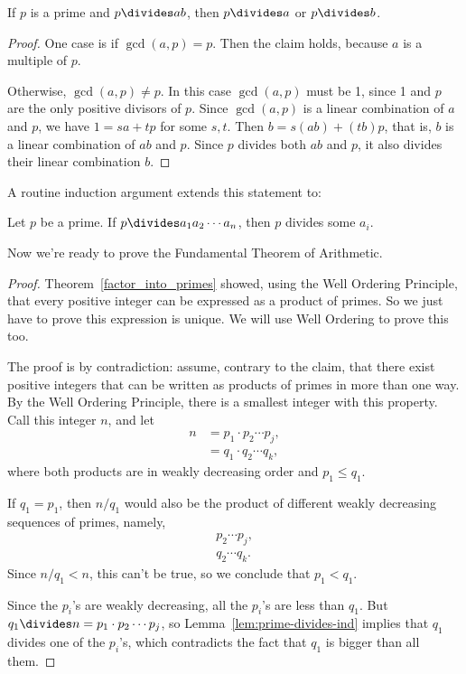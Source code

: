 \begin{lemma}
\label{lem:prime-divides}
If $p$ is a prime and $p \divides ab$, then $p \divides a$ or $p \divides b$.
\end{lemma}

\begin{proof}
One case is if $\gcd(a, p) = p$.  Then the claim holds, because $a$ is a multiple of $p$.

Otherwise, $\gcd(a, p) \neq p$.  In this case $\gcd(a, p)$ must be 1, since 1 and $p$ are
the only positive divisors of $p$.  Since $\gcd(a, p)$ is a linear combination of $a$ and
$p$, we have $1=sa+tp$ for some $s,t$.  Then $b =s(ab)+ (tb)p$, that is, $b$ is a linear
combination of $ab$ and $p$.  Since $p$ divides both $ab$ and $p$, it also divides their
linear combination $b$.
\end{proof}

A routine induction argument extends this statement to:\iffalse the fact we assumed last
time:\fi

\begin{lemma}
\label{lem:prime-divides-ind}
Let $p$ be a prime.  If $p \divides a_1 a_2 \cdots a_n$, then $p$ divides some $a_i$.
\end{lemma}

Now we're ready to prove the Fundamental Theorem of Arithmetic.
\begin{proof}
Theorem~\ref{factor_into_primes} showed, using the Well Ordering Principle, that every
positive integer can be expressed as a product of primes.  So we just have to prove this
expression is unique.  We will use Well Ordering to prove this too.

The proof is by contradiction: assume, contrary to the claim, that there exist positive
integers that can be written as products of primes in more than one way.  By the Well
Ordering Principle, there is a smallest integer with this property.  Call this integer $n$,
and let
\begin{align*}
n & = p_1 \cdot p_2 \cdots p_j, \\
  & = q_1 \cdot q_2 \cdots q_k,
\end{align*}
where both products are in weakly decreasing order and $p_1 \le q_1$.

If $q_1 = p_1$, then $n/q_1$ would also be the product of different weakly decreasing
sequences of primes, namely,
\begin{align*}
 p_2 \cdots p_j, \\
 q_2 \cdots q_k.
\end{align*}
Since $n/q_1 < n$, this can't be true, so we conclude that $p_1 < q_1$.

Since the $p_i$'s are weakly decreasing, all the $p_i$'s are less than $q_1$.  But $q_1
\divides n= p_1 \cdot p_2 \cdots p_j$, so Lemma~\ref{lem:prime-divides-ind} implies that
$q_1$ divides one of the $p_i$'s, which contradicts the fact that $q_1$ is bigger than all
them.
\end{proof}

